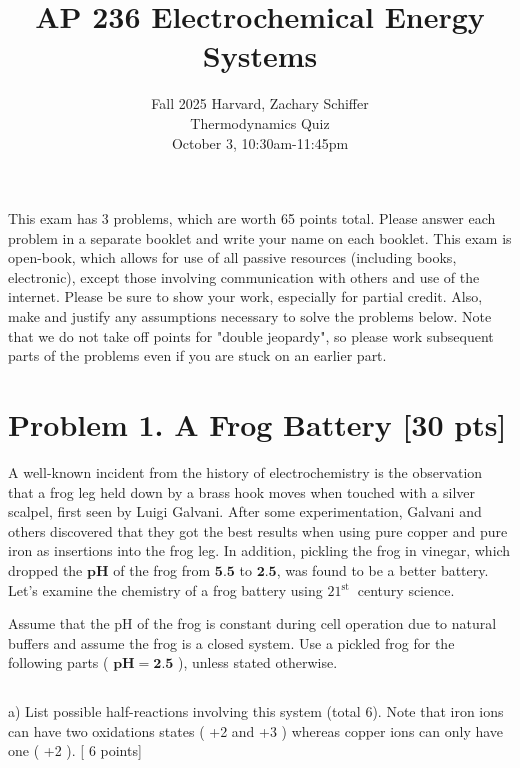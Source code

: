 \documentclass[12pt]{article}
\title{AP 236 Electrochemical Energy Systems }
\author{Fall 2025 Harvard, Zachary Schiffer\\
Thermodynamics Quiz\\
October 3, 10:30am-11:45pm}
\date{}
\begin{document}
\maketitle
\captionsetup{singlelinecheck=false}
This exam has 3 problems, which are worth 65 points total. Please answer each problem in a separate booklet and write your name on each booklet. This exam is open-book, which allows for use of all passive resources (including books, electronic), except those involving communication with others and use of the internet. Please be sure to show your work, especially for partial credit. Also, make and justify any assumptions necessary to solve the problems below. Note that we do not take off points for "double jeopardy", so please work subsequent parts of the problems even if you are stuck on an earlier part.

\section{Problem 1. A Frog Battery [30 pts]}
A well-known incident from the history of electrochemistry is the observation that a frog leg held down by a brass hook moves when touched with a silver scalpel, first seen by Luigi Galvani. After some experimentation, Galvani and others discovered that they got the best results when using pure copper and pure iron as insertions into the frog leg. In addition, pickling the frog in vinegar, which dropped the $\mathbf{p H}$ of the frog from $\mathbf{5 . 5}$ to $\mathbf{2 . 5}$, was found to be a better battery. Let's examine the chemistry of a frog battery using $21{ }^{\text {st }}$ century science.

Assume that the pH of the frog is constant during cell operation due to natural buffers and assume the frog is a closed system. Use a pickled frog for the following parts ( $\mathbf{p H}=\mathbf{2 . 5}$ ), unless stated otherwise.\\[0pt]
\subsection{}
a) List possible half-reactions involving this system (total 6). Note that iron ions can have two oxidations states ( +2 and +3 ) whereas copper ions can only have one ( +2 ). [ 6 points]\\
\end{document}
